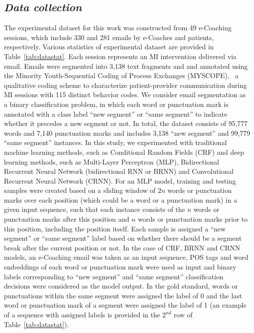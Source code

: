 \documentclass{amia}
\begin{document}
\subsection*{\textit{Data collection}}
The experimental dataset for this work was constructed from 49 e-Coaching sessions, which include 330 and 281 emails by e-Coaches and patients, respectively. Various statistics of experimental dataset are provided in Table~\ref{tab:datastat}. Each session represents an MI intervention delivered via email. Emails were segmented into 3,138 text fragments and and annotated using the Minority Youth-Sequential Coding of Process Exchanges (MYSCOPE),~\cite{carcone2013provider} a qualitative coding scheme to characterize patient-provider communication during MI sessions with 115 distinct behavior codes. We consider email segmentation as a binary classification problem, in which each word or punctuation mark is annotated with a class label ``new segment'' or ``same segment'' to indicate whether it precedes a new segment or not. In total, the dataset consists of 95,777 words and 7,140 punctuation marks and includes 3,138 ``new segment'' and 99,779 ``same segment'' instances. In this study, we experimented with traditional machine learning methods, such as Conditional Random Fields (CRF)\cite{lafferty2001conditional} and deep learning methods, such as Multi-Layer Perceptron (MLP),\cite{rumelhart1986learning} Bidirectional Recurrent Neural Network (bidirectional RNN or BRNN)\cite{schuster1997bidirectional} and Convolutional Recurrent Neural Network (CRNN).\cite{treviso2017sentence} For an MLP model, training and testing samples were created based on a sliding window of $2n$ words or punctuation marks over each position (which could be a word or a punctuation mark) in a given input sequence, such that each instance consists of the $n$ words or punctuation marks after this position and $n$ words or punctuation marks prior to this position, including the position itself. Each sample is assigned a ``new segment'' or ``same segment'' label based on whether there should be a segment break after the current position or not. In the case of CRF, BRNN and CRNN models, an e-Coaching email was taken as an input sequence, POS tags and word embeddings of each word or punctuation mark were used as input and binary labels corresponding to ``new segment'' and ``same segment'' classification decisions were considered as the model output. In the gold standard, words or punctuations within the same segment were assigned the label of 0 and the last word or punctuation mark of a segment were assigned the label of 1 (an example of a sequence with assigned labels is provided in the $2^{nd}$ row of Table~\ref{tab:datastat}). \\ 
\end{document}
